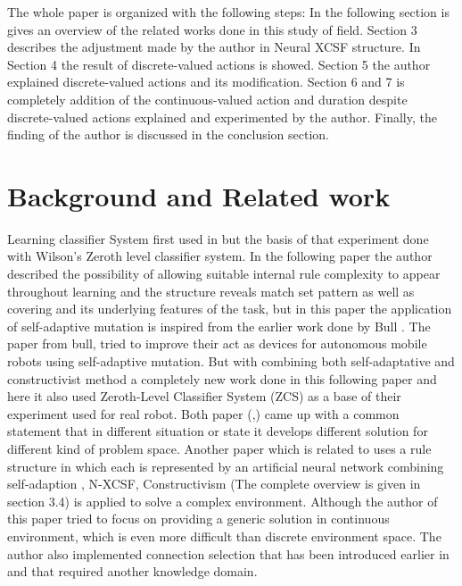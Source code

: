 \documentclass[12pt]{article}
\begin{document}
The whole paper is organized with the following steps: In the following section is gives an overview of the related works done in this study of field. Section 3 describes the adjustment made by the author in Neural XCSF structure. In Section 4 the result of discrete-valued actions is showed. Section 5 the author explained discrete-valued actions and its modification. Section 6 and 7 is completely addition of the continuous-valued action and duration despite discrete-valued actions explained and experimented by the author.  Finally, the finding of the author is discussed in the conclusion section.


\section{Background and Related work}
\label{sec:meth}
Learning classifier System first used in \cite{10.1007/3-540-45712-7_54} but the basis of that experiment done with Wilson’s Zeroth level classifier system. In the following paper the author described the possibility of allowing suitable internal rule complexity to appear throughout learning and the structure reveals match set pattern as well as covering and its underlying features of the task, but in this paper  the application of self-adaptive mutation is inspired from the earlier work done by Bull \cite{111111111}. The paper from bull, tried to improve their act as devices for autonomous mobile robots using self-adaptive mutation. But with combining both self-adaptative and constructivist method a completely new work done in this following paper \cite{10.1145/1389095.1389364} and here it also used Zeroth-Level Classifier System (ZCS) as a base of their experiment used for real robot. Both paper (\cite{doi:10.1162/artl.2006.12.3.353},\cite{10.1007/3-540-45712-7_57}) came up with a common statement that in different situation or state it develops different solution for different kind of problem space. Another paper which is related to \cite{10.1145/1389095.1389364} uses a rule structure in which each is represented by an artificial neural network combining self-adaption \cite{111111111}, N-XCSF, Constructivism \cite{quartz_sejnowski_1997} (The complete overview is given in section 3.4) is applied to solve a complex environment. Although the author of this paper tried to focus on providing a generic solution in continuous environment, which is even more difficult than discrete environment space. The author also implemented connection selection that has been introduced earlier in \cite{10.1145/1388969.1389010} and that required another knowledge domain.
\end{document}
